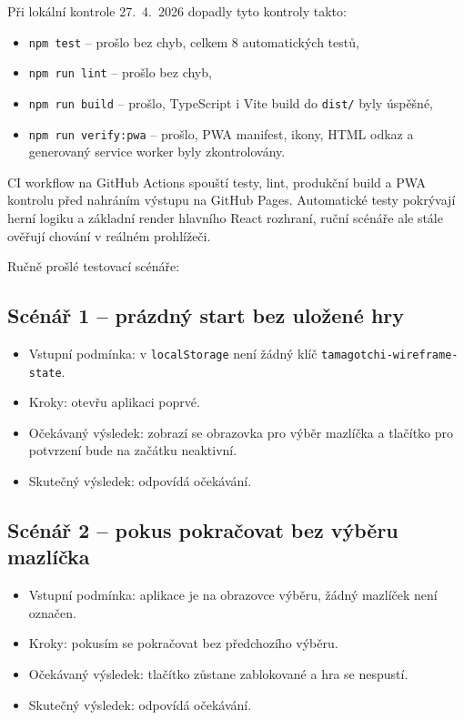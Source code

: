 \documentclass[12pt,a4paper]{article}
\begin{document}
Při lokální kontrole 27.~4.~2026 dopadly tyto kontroly takto:
\begin{itemize}[leftmargin=2em]
  \item \texttt{npm test} -- prošlo bez chyb, celkem 8 automatických testů,
  \item \texttt{npm run lint} -- prošlo bez chyb,
  \item \texttt{npm run build} -- prošlo, TypeScript i Vite build do \texttt{dist/} byly úspěšné,
  \item \texttt{npm run verify:pwa} -- prošlo, PWA manifest, ikony, HTML odkaz a generovaný service worker byly zkontrolovány.
\end{itemize}

CI workflow na GitHub Actions spouští testy, lint, produkční build a PWA kontrolu před nahráním výstupu na GitHub Pages. Automatické testy pokrývají herní logiku a základní render hlavního React rozhraní, ruční scénáře ale stále ověřují chování v reálném prohlížeči.

Ručně prošlé testovací scénáře:

\subsection*{Scénář 1 -- prázdný start bez uložené hry}
\begin{itemize}[leftmargin=2em]
  \item Vstupní podmínka: v \texttt{localStorage} není žádný klíč \texttt{tamagotchi-wireframe-state}.
  \item Kroky: otevřu aplikaci poprvé.
  \item Očekávaný výsledek: zobrazí se obrazovka pro výběr mazlíčka a tlačítko pro potvrzení bude na začátku neaktivní.
  \item Skutečný výsledek: odpovídá očekávání.
\end{itemize}

\subsection*{Scénář 2 -- pokus pokračovat bez výběru mazlíčka}
\begin{itemize}[leftmargin=2em]
  \item Vstupní podmínka: aplikace je na obrazovce výběru, žádný mazlíček není označen.
  \item Kroky: pokusím se pokračovat bez předchozího výběru.
  \item Očekávaný výsledek: tlačítko  zůstane zablokované a hra se nespustí.
  \item Skutečný výsledek: odpovídá očekávání.
\end{itemize}
\end{document}
